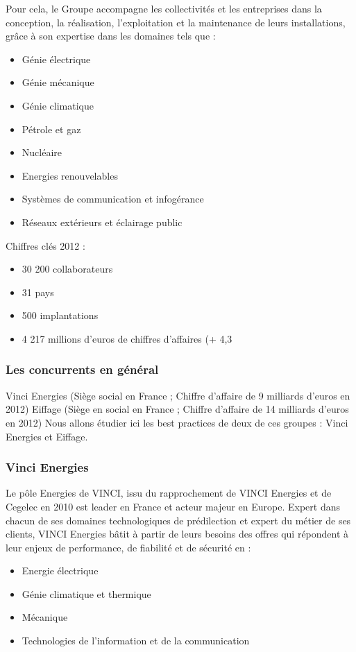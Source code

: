 	Pour cela, le Groupe accompagne les collectivités et les entreprises dans la conception, la réalisation, l'exploitation et la maintenance de leurs installations, grâce à son expertise dans les domaines tels que :
\begin{itemize}
	\item Génie électrique
	\item Génie mécanique
	\item Génie climatique
	\item Pétrole et gaz
	\item Nucléaire
	\item Energies renouvelables
	\item Systèmes de communication et infogérance
	\item Réseaux extérieurs et éclairage public
\end{itemize}

Chiffres clés 2012 :
\begin{itemize}
	\item 30 200 collaborateurs
	\item 31 pays
	\item 500 implantations
	\item 4 217 millions d'euros de chiffres d'affaires (+ 4,3%
\end{itemize}

\subsubsection{Les concurrents en général}
Vinci Energies (Siège social en France ; Chiffre d'affaire de 9 milliards d’euros en 2012)
Eiffage (Siège en social en France ; Chiffre d'affaire de 14 milliards d’euros en 2012)
	Nous allons étudier ici les best practices de deux de ces groupes : Vinci Energies et Eiffage.

\subsubsection{Vinci Energies}
	Le pôle Energies de VINCI, issu du rapprochement de VINCI Energies et de Cegelec en 2010 est leader en France et acteur majeur en Europe. 
	Expert dans chacun de ses domaines technologiques de prédilection et expert du métier de ses clients, VINCI Energies bâtit à partir de leurs besoins des offres qui répondent à leur enjeux de performance, de fiabilité et de sécurité en :
\begin{itemize}
	\item Energie électrique
	\item Génie climatique et thermique
	\item Mécanique
	\item Technologies de l'information et de la communication
\end{itemize}


